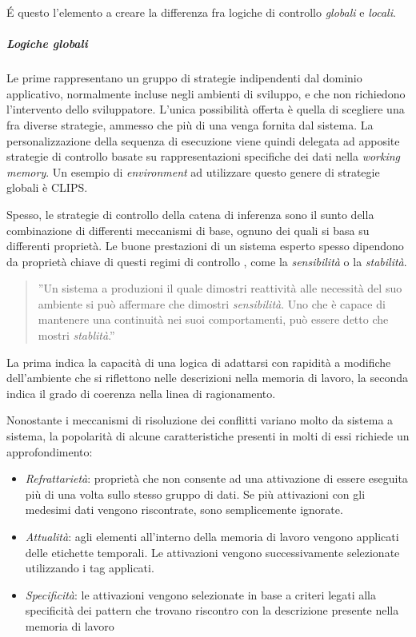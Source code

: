 \'E questo l'elemento a creare la differenza fra logiche di controllo \emph{globali} e \emph{locali}. 

\subparagraph{Logiche globali} Le prime rappresentano un gruppo di strategie indipendenti dal dominio applicativo, normalmente incluse negli ambienti di sviluppo, e che non richiedono l'intervento dello sviluppatore. L'unica possibilità offerta è quella di scegliere una fra diverse strategie, ammesso che più di una venga fornita dal sistema. La personalizzazione della sequenza di esecuzione viene quindi delegata ad apposite strategie di controllo basate su rappresentazioni specifiche dei dati nella \emph{working memory}. Un esempio di \emph{environment} ad utilizzare questo genere di strategie globali è CLIPS.

Spesso, le strategie di controllo della catena di inferenza sono il sunto della combinazione di differenti meccanismi di base, ognuno dei quali si basa su differenti proprietà. Le buone prestazioni di un sistema esperto spesso dipendono da proprietà chiave di questi regimi di controllo \cite{jackson1999}, come la \emph{sensibilità} o la \emph{stabilità}.
\begin{quote}
	''Un sistema a produzioni il quale dimostri reattività alle necessità del suo ambiente si può affermare che dimostri \emph{sensibilità}. Uno che è capace di mantenere una continuità nei suoi comportamenti, può essere detto che mostri \emph{stablità}.''\cite{McDermott:1977:PSC:1045343.1045364}
\end{quote} 
La prima indica la capacità di una logica di adattarsi con rapidità a modifiche dell'ambiente che si riflettono nelle descrizioni nella memoria di lavoro, la seconda indica il grado di coerenza nella linea di ragionamento.\cite{jackson1999}

Nonostante i meccanismi di risoluzione dei conflitti variano molto da sistema a sistema, la popolarità di alcune caratteristiche presenti in molti di essi richiede un approfondimento:

\begin{itemize}
	\item \emph{Refrattarietà}: proprietà che non consente ad una attivazione di essere eseguita più di una volta sullo stesso gruppo di dati. Se più attivazioni con gli medesimi dati vengono riscontrate, sono semplicemente ignorate.
	\item \emph{Attualità}: agli elementi all'interno della memoria di lavoro vengono applicati delle etichette temporali. Le attivazioni vengono successivamente selezionate utilizzando i tag applicati.
	\item \emph{Specificità}: le attivazioni vengono selezionate in base a criteri legati alla specificità dei pattern che trovano riscontro con la descrizione presente nella memoria di lavoro
\end{itemize}

